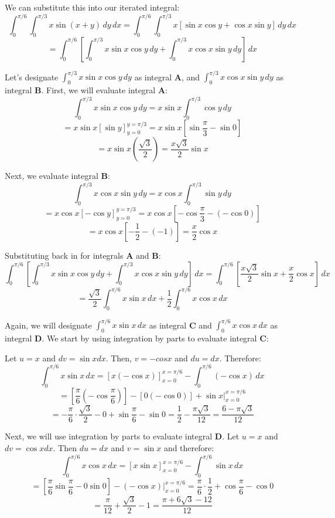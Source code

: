 \begin{Answer}[ref = fubini_2]
\begin{enumerate}
We can substitute this into our iterated integral:
$$\int_0^{\pi/6} \int_0^{\pi/3} x \sin{ \left( x + y \right) }\,dy\,dx = 
\int_0^{\pi/6} \int_0^{\pi/3} x \left[ \sin{x}\cos{y} + \cos{x}\sin{y} 
\right]\,dy\,dx$$
$$= \int_0^{\pi/6} \left[ \int_0^{\pi/3} x \sin{x} \cos{y}\,dy + \int_0^{\pi/3}
x \cos{x} \sin{y}\,dy \right]\,dx$$

Let's designate $\int_0^{\pi/3} x \sin{x} \cos{y}\,dy$ as integral \textbf{A}, 
and $\int_0^{\pi/3} x \cos{x} \sin{y}\,dy$ as integral \textbf{B}. First, we 
will evaluate integral \textbf{A}:
$$\int_0^{\pi/3} x \sin{x} \cos{y}\,dy = x \sin{x} \int_0^{\pi/3} \cos{y}\,dy$$
$$= x \sin{x} \left[ \sin{y} \right]_{y = 0}^{y = \pi/3} = x \sin{x} \left[ 
\sin{\frac{\pi}{3}} - \sin{0} \right]$$
$$= x \sin{x} \left( \frac{\sqrt{3}}{2} \right) = \frac{x \sqrt{3}}{2} \sin{x}$$

Next, we evaluate integral \textbf{B}:
$$\int_0^{\pi/3} x \cos{x} \sin{y}\,dy = x \cos{x} \int_0^{\pi/3} \sin{y}\,dy$$
$$= x \cos{x} \left[ - \cos{y} \right]_{y = 0}^{y = \pi/3} = x \cos{x} \left[ -
\cos{\frac{\pi}{3}} - \left( - \cos{0} \right) \right]$$
$$= x\cos{x} \left[ - \frac{1}{2} - (-1) \right] = \frac{x}{2}\cos{x}$$

Substituting back in for integrals \textbf{A} and \textbf{B}:
$$\int_0^{\pi/6} \left[ \int_0^{\pi/3} x \sin{x} \cos{y}\,dy + \int_0^{\pi/3} 
x \cos{x} \sin{y}\,dy \right]\,dx = \int_0^{\pi/6} \left[ \frac{x \sqrt{3}}{2} 
\sin{x} + \frac{x}{2}\cos{x} \right]\,dx$$
$$= \frac{\sqrt{3}}{2} \int_0^{\pi/6} x \sin{x}\,dx + \frac{1}{2} \int_0^{
\pi/6} x \cos{x}\,dx$$

Again, we will designate $\int_0^{\pi/6} x \sin{x}\,dx$ as integral \textbf{C} 
and $\int_0^{\pi/6} x \cos{x}\,dx$ as integral \textbf{D}. We start by using 
integration by parts to evaluate integral \textbf{C}:

Let $u = x$ and $dv = \sin{x} dx$. Then, $v = -cos{x}$ and $du = dx$. Therefore:
$$\int_0^{\pi/6} x \sin{x}\,dx = \left[ x \left(- \cos{x} \right) \right]_{x = 
0}^{x = \pi/6} - \int_0^{\pi/6} \left( - \cos{x} \right)\,dx$$
$$= \left[ \frac{\pi}{6} \left(- \cos{\frac{\pi}{6}} \right) \right] - \left[ 
0 \left(- \cos{0} \right) \right] + \sin{x}|_{x = 0}^{x = \pi/6}$$
$$= -\frac{\pi}{6} \cdot \frac{\sqrt{3}}{2} - 0 + \sin{\frac{\pi}{6}} - 
\sin{0} = \frac{1}{2} - \frac{\pi \sqrt{3}}{12} = \frac{6 - \pi \sqrt{3}}{12}$$

Next, we will use integration by parts to evaluate integral \textbf{D}. Let $u 
= x$ and $dv = \cos{x} dx$. Then $du = dx$ and $v = \sin{x}$ and therefore:
$$\int_0^{\pi/6} x \cos{x}\,dx = \left[ x \sin{x} \right]_{x = 0}^{x = \pi/6} -
\int_0^{\pi/6} \sin{x}\,dx$$
$$= \left[ \frac{\pi}{6}\sin{\frac{\pi}{6}} - 0\sin{0} \right] - \left( - 
\cos{x} \right)|_{x = 0}^{x = \pi/6} = \frac{\pi}{6} \cdot \frac{1}{2} + 
\cos{\frac{\pi}{6}} - \cos{0}$$
$$= \frac{\pi}{12} + \frac{\sqrt{3}}{2} - 1 = \frac{\pi + 6\sqrt{3} - 12}{12}$$


\end{enumerate}
\end{Answer}
